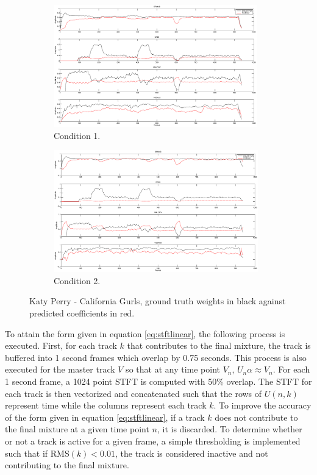 \documentclass{article}
\begin{document}
\begin{figure}[!htbp]
\centering
\begin{subfigure}{\columnwidth}
\includegraphics[height=200px, width=\columnwidth]{kp_cg.eps}%
\caption{Condition 1.}
\label{subfiga}%
\end{subfigure}%
\begin{subfigure}{\columnwidth}
\includegraphics[height=200px, width=\columnwidth]{kp_cg_extrafeatures.eps}%
\caption{Condition 2.}
\label{subfigb}%
\end{subfigure}%
\caption{Katy Perry - California Gurls, ground truth weights in black against predicted coefficients in red.}
\label{fig:katyperrycoef}
\end{figure}

To attain the form given in equation \ref{eq:stftlinear}, the following process is executed.  First, for each track $k$ that contributes to the final mixture, the track is buffered into 1 second frames which overlap by 0.75 seconds.  This process is also executed for the master track $V$ so that at any time point $V_n$, $U_n\alpha \approx V_n$.  For each 1 second frame, a 1024 point STFT is computed with 50\% overlap.  The STFT for each track is then vectorized and concatenated such that the rows of $U(n, k)$ represent time while the columns represent each track $k$.  To improve the accuracy of the form given in equation \ref{eq:stftlinear}, if a track $k$ does not contribute to the final mixture at a given time point $n$, it is discarded.  To determine whether or not a track is active for a given frame, a simple thresholding is implemented such that if RMS$(k) < 0.01$, the track is considered inactive and not contributing to the final mixture.
\end{document}
